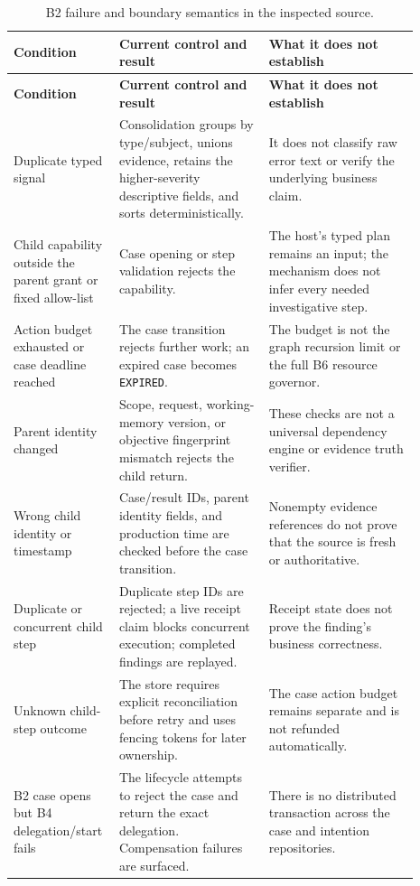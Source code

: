 \small
\begin{longtable}{>{\raggedright\arraybackslash}p{0.19\linewidth} >{\raggedright\arraybackslash}p{0.35\linewidth} >{\raggedright\arraybackslash}p{0.35\linewidth}}
\caption{B2 failure and boundary semantics in the inspected source.}\label{tab:ch22-failure-semantics}\\
\toprule
\textbf{Condition} & \textbf{Current control and result} & \textbf{What it does not establish} \\
\midrule
\endfirsthead
\toprule
\textbf{Condition} & \textbf{Current control and result} & \textbf{What it does not establish} \\
\midrule
\endhead
Duplicate typed signal & Consolidation groups by type/subject, unions evidence, retains the higher-severity descriptive fields, and sorts deterministically. & It does not classify raw error text or verify the underlying business claim. \\
Child capability outside the parent grant or fixed allow-list & Case opening or step validation rejects the capability. & The host's typed plan remains an input; the mechanism does not infer every needed investigative step. \\
Action budget exhausted or case deadline reached & The case transition rejects further work; an expired case becomes \texttt{EXPIRED}. & The budget is not the graph recursion limit or the full B6 resource governor. \\
Parent identity changed & Scope, request, working-memory version, or objective fingerprint mismatch rejects the child return. & These checks are not a universal dependency engine or evidence truth verifier. \\
Wrong child identity or timestamp & Case/result IDs, parent identity fields, and production time are checked before the case transition. & Nonempty evidence references do not prove that the source is fresh or authoritative. \\
Duplicate or concurrent child step & Duplicate step IDs are rejected; a live receipt claim blocks concurrent execution; completed findings are replayed. & Receipt state does not prove the finding's business correctness. \\
Unknown child-step outcome & The store requires explicit reconciliation before retry and uses fencing tokens for later ownership. & The case action budget remains separate and is not refunded automatically. \\
B2 case opens but B4 delegation/start fails & The lifecycle attempts to reject the case and return the exact delegation. Compensation failures are surfaced. & There is no distributed transaction across the case and intention repositories. \\

\end{longtable}
